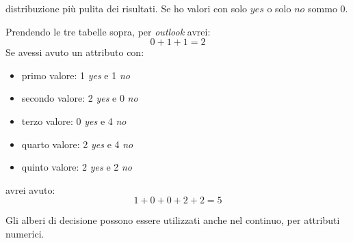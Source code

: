 \documentclass[a4paper,12pt, oneside]{book}
\begin{document}
distribuzione più pulita dei risultati. Se ho valori con solo
$yes$ o solo $no$ sommo 0.
\begin{esempio}
  Prendendo le tre tabelle sopra, per \textit{outlook} avrei:
  \[0+1+1=2\]
  Se avessi avuto un attributo con:
  \begin{itemize}
    \item primo valore: 1 \textit{yes} e 1 \textit{no}
    \item secondo valore: 2 \textit{yes} e 0 \textit{no}
    \item terzo valore: 0 \textit{yes} e 4 \textit{no}
    \item quarto valore: 2 \textit{yes} e 4 \textit{no}
    \item quinto valore: 2 \textit{yes} e 2 \textit{no} 
  \end{itemize}
  avrei avuto:
  \[1+0+0+2+2=5\]
\end{esempio}
Gli alberi di decisione possono essere utilizzati anche nel continuo, per
attributi numerici.
\end{document}
